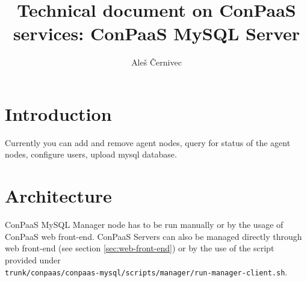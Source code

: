 \documentclass[a4paper,10pt]{article}
\begin{document}
\title{Technical document on ConPaaS services: ConPaaS MySQL Server}
\vspace{15pt}
\author{Ale{\v s} {\v C}ernivec}
\vspace{50pt}
\maketitle
\vspace{15pt}
\setlength{\parindent}{15pt}
\newpage
\tableofcontents
\newpage
\newcommand{\Cmd}[1]{\noindent {\tt #1 }\newline\vspace{2pt}\\}
\newcommand{\Des}[1]{\vspace{4pt}\noindent {\bf Description: }\\{#1}\vspace{2pt}\\ }
\newcommand{\Par}[1]{\vspace{4pt}\noindent {\bf Parameters: } \\{#1}\vspace{2pt}\\}
\newcommand{\Ret}[1]{\vspace{4pt}\noindent {\bf Returns: }\\{#1}\vspace{2pt}\\}
\newcommand{\Rai}[1]{\vspace{4pt}\noindent {\bf Raises: }\\{#1}\vspace{2pt}\\}
\newcommand{\conapi}[5]{\Cmd{#1} \Des{#2} \Par{#3} \Ret{#4} \Rai{#5}\\}

\section{Introduction}

Currently you can add and remove agent nodes, query for status of the agent nodes, configure users, upload mysql database. 

\section{Architecture}

ConPaaS MySQL Manager node has to be run manually or by the usage of ConPaaS web front-end. ConPaaS Servers can also be managed directly through web front-end (see section \ref{sec:web-front-end}) or by the use of the script provided under \\ {\tt trunk/conpaas/conpaas-mysql/scripts/manager/run-manager-client.sh}.
\end{document}
